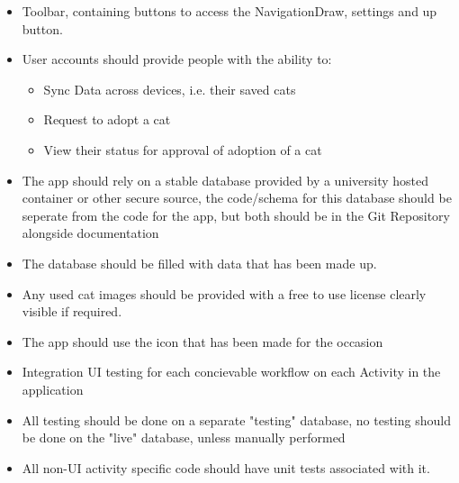 \begin{itemize}
\begin{itemize}
        \end{itemize}
    \item Toolbar, containing buttons to access the NavigationDraw, settings and up button.
    \item User accounts should provide people with the ability to:
        \begin{itemize}
            \item Sync Data across devices, i.e. their saved cats
            \item Request to adopt a cat
            \item View their status for approval of adoption of a cat
        \end{itemize}
    \item The app should rely on a stable database provided by a university hosted container or other secure source, the code/schema for this database should be seperate from the code for the app, but both should be in the Git Repository alongside documentation
    \item The database should be filled with data that has been made up.
    \item Any used cat images should be provided with a free to use license clearly visible if required.
    \item The app should use the icon that has been made for the occasion
    \item Integration UI testing for each concievable workflow on each Activity in the application
    \item All testing should be done on a separate "testing" database, no testing should be done on the "live" database, unless manually performed
    \item All non-UI activity specific code should have unit tests associated with it.
\end{itemize}

